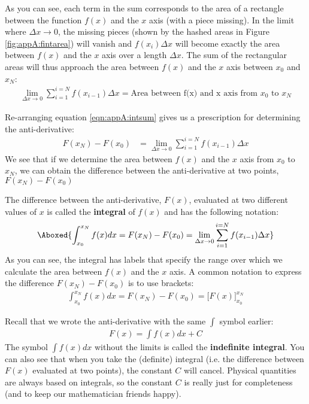 As you can see, each term in the sum corresponds to the area of a rectangle between the function $f(x)$ and the $x$ axis (with a piece missing). In the limit where $\Delta x\to 0$, the missing pieces (shown by the hashed areas in Figure \ref{fig:appA:fintarea}) will vanish and $f(x_i)\Delta x$ will become exactly the area between $f(x)$ and the $x$ axis over a length $\Delta x$. The sum of the rectangular areas will thus approach the area between $f(x)$ and the  $x$ axis between $x_0$ and $x_N$:
\begin{align*}
\lim_{\Delta x\to 0}\sum_{i=1}^{i=N} f(x_{i-1}) \Delta x=\text{Area between f(x) and x axis from $x_0$ to $x_N$}
\end{align*}

Re-arranging equation \ref{eqn:appA:intsum} gives us a prescription for determining the anti-derivative:
\begin{align*}
F(x_N) - F(x_0)&=\lim_{\Delta x\to 0}\sum_{i=1}^{i=N} f(x_{i-1}) \Delta x
\end{align*}
We see that if we determine the area between $f(x)$ and the $x$ axis from $x_0$ to $x_N$, we can obtain the difference between the anti-derivative at two points, $F(x_N)-F(x_0)$


The difference between the anti-derivative, $F(x)$, evaluated at two different values of $x$ is called the \textbf{integral} of $f(x)$ and has the following notation:
\begin{align}
\label{eqn:appA:intdef}
\Aboxed{\int_{x_0}^{x_N}f(x) dx=F(x_N) - F(x_0)=\lim_{\Delta x\to 0}\sum_{i=1}^{i=N} f(x_{i-1}) \Delta x}
\end{align}
As you can see, the integral has labels that specify the range over which we calculate the area between $f(x)$ and the $x$ axis. A common notation to express the difference $F(x_N) - F(x_0)$ is to use brackets:
\begin{align*}
\int_{x_0}^{x_N}f(x) dx=F(x_N) - F(x_0) =\big [ F(x) \big]_{x_0}^{x_N}
\end{align*}


Recall that we wrote the anti-derivative with the same $\int$ symbol earlier:
\begin{align*}
F(x) = \int f(x) dx +C
\end{align*}
The symbol $\int f(x) dx$ without the limits is called the \textbf{indefinite integral}. You can also see that when you take the (definite) integral (i.e. the  difference between $F(x)$ evaluated at two points), the constant $C$ will cancel. Physical quantities are always based on integrals, so the constant $C$ is really just for completeness (and to keep our mathematician friends happy).

